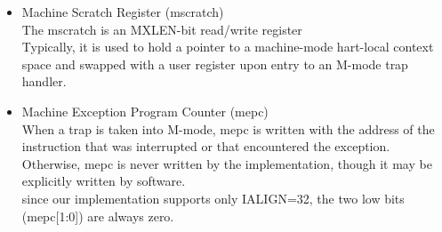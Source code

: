 \documentclass[../main.tex]{subfiles}
\begin{document}
\begin{itemize}
    \item Machine Scratch Register (mscratch)\\
        The mscratch is an MXLEN-bit read/write register\\
        Typically, it is used to hold a pointer to a machine-mode hart-local context space and swapped with a user register upon entry to an M-mode trap handler.\\
            
    \item Machine Exception Program Counter (mepc)\\
        When a trap is taken into M-mode, mepc is written with the address of the instruction that was interrupted or that encountered the exception. Otherwise, mepc is never written by the implementation, though it may be explicitly written by software.\\
        since our implementation supports only IALIGN=32, the two low bits (mepc[1:0]) are always zero.\\
            

\end{itemize}
\end{document}
